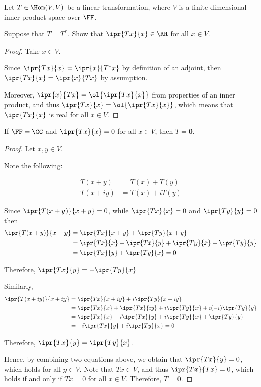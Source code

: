 \documentclass[11pt]{scrartcl}
\begin{document}
Let $T \in \Hom(V,V)$ be a linear transformation, where $V$ is a
finite-dimensional inner product space over $\FF$.

\begin{lemma}
  \label{sec:2}
  Suppose that $T = T^{*}$. Show that $\ipr{Tx}{x}\in\RR$ for all $x\in V$.
\end{lemma}

\begin{proof}
  \hfill

  Take $x\in V$.
  
  Since $\ipr{Tx}{x} = \ipr{x}{T^{*}x}$ by definition of an adjoint,
  then $\ipr{Tx}{x} = \ipr{x}{Tx}$ by assumption.

  Moreover, $\ipr{x}{Tx}= \ol{\ipr{Tx}{x}}$ from properties of an
  inner product, and thus $\ipr{Tx}{x} = \ol{\ipr{Tx}{x}}$, which
  means that $\ipr{Tx}{x}$ is real for all $x\in V$.
\end{proof}

\begin{lemma}
  \label{sec:1}
  If $\FF = \CC$ and $\ipr{Tx}{x}=0$ for all $x\in V$, then $T = \bm{0}$.
\end{lemma}

\begin{proof}
  \hfill

  Let $x, y\in V$.

  Note the following:

  \begin{align}
    T(x+y)  & = T(x) + T(y) \\
    T(x+iy) & = T(x) + iT(y)
  \end{align}

  Since $\ipr{T(x+y)}{x+y}= 0$, while $\ipr{Tx}{x} = 0$ and
  $\ipr{Ty}{y}=0$ then
  \begin{align}
    \ipr{T(x+y)}{x+y} & = \ipr{Tx}{x+y}+\ipr{Ty}{x+y}                     \\
                      & = \ipr{Tx}{x}+\ipr{Tx}{y}+\ipr{Ty}{x}+\ipr{Ty}{y} \\
                      & = \ipr{Tx}{y}+\ipr{Ty}{x} = 0
  \end{align}

  Therefore, $\ipr{Tx}{y}=-\ipr{Ty}{x}$

  Similarly,
  \begin{align}
    \ipr{T(x+iy)}{x+iy} & = \ipr{Tx}{x+iy}+i\ipr{Ty}{x+iy}                         \\
                        & = \ipr{Tx}{x}+\ipr{Tx}{iy}+i\ipr{Ty}{x}+i(-i)\ipr{Ty}{y} \\
                        & = \ipr{Tx}{x}-i\ipr{Tx}{y}+i\ipr{Ty}{x}+\ipr{Ty}{y}      \\
                        & = -i\ipr{Tx}{y}+i\ipr{Ty}{x} = 0
  \end{align}

  Therefore, $\ipr{Tx}{y} = \ipr{Ty}{x}$.

  Hence, by combining two equations above, we obtain that
  $\ipr{Tx}{y} = 0$, which holds for all $y\in V$. Note that
  $Tx\in V$, and thus $\ipr{Tx}{Tx} = 0$, which holds if and only if
  $Tx=0$ for all $x\in V$. Therefore, $T = \bm{0}$.
\end{proof}
\end{document}
